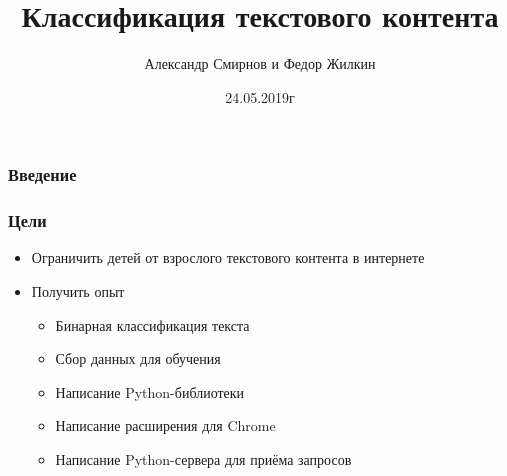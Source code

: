 \documentclass[xetex,mathserif,serif]{beamer}
\title{Классификация текстового контента}
\author{Александр Смирнов и Федор Жилкин}
\date{24.05.2019г}
\begin{document}
	\frame{\titlepage}

	\begin{frame}
		\frametitle{Введение}
		\begin{figure}[h]
        \end{figure}
	\end{frame}
	
	\begin{frame}
		\frametitle{Цели}
			\begin{itemize}
		 		\item Ограничить детей от взрослого текстового контента в интернете
				\item Получить опыт
    				\begin{itemize}
    			    	\item Бинарная классификация текста
    			    	\item Сбор данных для обучения
    			    	\item Написание Python-библиотеки
    			    	\item Написание расширения для Chrome
    			    	\item Написание Python-сервера для приёма запросов
    		    	\end{itemize}
			\end{itemize}
	\end{frame}
	
\end{document}
